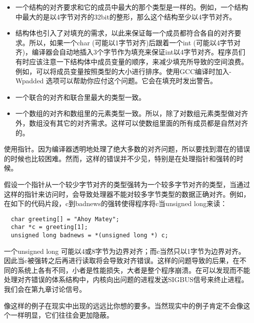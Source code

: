 \begin{itemize}
\item \begin{flushleft}一个结构的对齐要求和它的成员中最大的那个类型是一样的。例如，一个结构中最大的是以4字节对齐的32bit的整形，那么这个结构至少以4字节对齐。\end{flushleft}
\item \begin{flushleft}结构体也引入了对填充的需求，以此来保证每一个成员都符合各自的对齐要求。所以，如果一个char (可能以1字节对齐)后跟着一个int (可能以4字节对齐)，编译器会自动地插入3个字节作为填充来保证int以4字节对齐。程序员们有时应该注意一下结构体中成员变量的顺序，来减少填充所导致的空间浪费。例如，可以将成员变量按照类型的大小进行排序。使用GCC编译时加入-Wpadded 选项可以帮助你应付这个问题。它会在填充时发出警告。\end{flushleft}
\item \begin{flushleft}一个联合的对齐和联合里最大的类型一致。 \end{flushleft}
\item \begin{flushleft}一个数组的对齐和数组里的元素类型一致。所以，除了对数组元素类型做对齐外，数组没有其它的对齐需求。这样可以使数组里面的所有成员都是自然对齐的。\end{flushleft}
\end{itemize}

  使用指针。因为编译器透明地处理了绝大多数的对齐问题，所以要找到潜在的错误的时候也比较困难。然而，这样的错误并不少见，特别是在处理指针和强转的时候。

假设一个指针从一个较少字节对齐的类型强转为一个较多字节对齐的类型，当通过这样的指针来访问时，会导致处理器不能对较多字节类型的数据正确对齐。例如，在如下的代码片段，c到badnews的强转使得程序将c当unsigned long来读： 

\begin{lstlisting}
  char greeting[] = "Ahoy Matey";
  char *c = greeting[1];
  unsigned long badnews = *(unsigned long *) c;
\end{lstlisting}

一个unsigned long 可能以4或8字节为边界对齐；而c当然只以1字节为边界对齐。因此当c被强转之后再进行读取将会导致对齐错误。这样的问题导致的后果，在不同的系统上各有不同，小者是性能损失，大者是整个程序崩溃。在可以发现而不能处理对齐错误的体系结构中，内核向出问题的进程发送SIGBUS信号来终止进程。我们会在第九章讨论信号。

像这样的例子在现实中出现的远远比你想的要多。当然现实中的例子肯定不会像这个一样明显，它们往往会更加隐蔽。 

